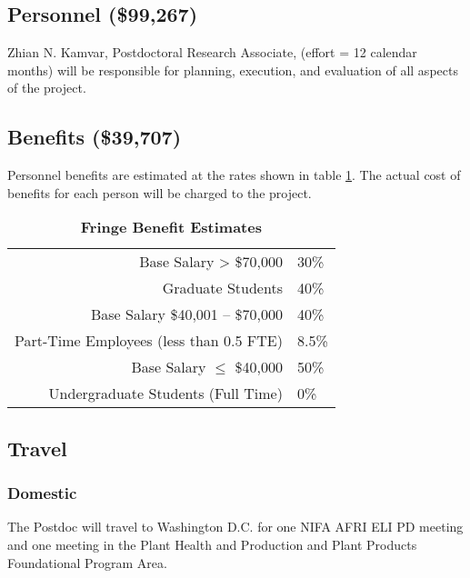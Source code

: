 \documentclass[12pt,letterpaper]{article}
\title{\ruleline{Budget Justification}}
\begin{document}
\maketitle

\subsection{Personnel (\$99,267)}
Zhian N. Kamvar, Postdoctoral Research Associate, (effort = 12 calendar months) will be responsible for planning, execution, and evaluation of all aspects of the project.

\subsection{Benefits (\$39,707)}

Personnel benefits are estimated at the rates shown in table \ref{fbe}. 
The actual cost of benefits for each person will be charged to the project. 

\begin{table}[h!]
\centering
\begin{tabular}{rl}
\hline
Base Salary > \$70,000 & 30\% \\
Graduate Students & 40\% \\
Base Salary \$40,001 -- \$70,000 & 40\% \\
Part-Time Employees (less than 0.5 FTE) & 8.5\% \\
Base Salary $\leq$ \$40,000 & 50\% \\
Undergraduate Students (Full Time) & 0\%\\\hline
\end{tabular}
\caption{\label{fbe}\textbf{Fringe Benefit Estimates}}
\end{table}



\subsection{Travel}
\subsubsection{Domestic}

The Postdoc will travel to Washington D.C. for one NIFA AFRI ELI PD meeting and one meeting in the Plant Health and Production and Plant Products Foundational Program Area. 
\end{document}
